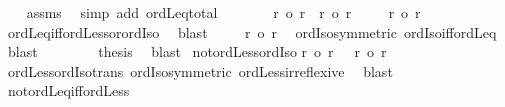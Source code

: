 \begin{isabellebody}
\ \ \isamarkupfalse%
\ assms\ \isamarkupfalse%
\ {\isacharparenleft}{\kern0pt}simp\ add{\isacharcolon}{\kern0pt}\ ordLeq{\isacharunderscore}{\kern0pt}total{\isacharparenright}{\kern0pt}\isanewline
\ \ \isamarkupfalse%
\isanewline
\ \ \isacommand{{\isacharbraceleft}{\kern0pt}}\isamarkupfalse%
\isamarkupfalse%
\ {\isachardoublequoteopen}{\isasymnot}\ r\ {\isacharless}{\kern0pt}o\ r{\isacharprime}{\kern0pt}\ {\isasymand}\ r\ {\isasymle}o\ r{\isacharprime}{\kern0pt}{\isachardoublequoteclose}\isanewline
\ \ \ \isamarkupfalse%
\ {\isachardoublequoteopen}r\ {\isacharequal}{\kern0pt}o\ r{\isacharprime}{\kern0pt}{\isachardoublequoteclose}\ \isamarkupfalse%
\ ordLeq{\isacharunderscore}{\kern0pt}iff{\isacharunderscore}{\kern0pt}ordLess{\isacharunderscore}{\kern0pt}or{\isacharunderscore}{\kern0pt}ordIso\ \isamarkupfalse%
\ blast\isanewline
\ \ \ \isamarkupfalse%
\ {\isachardoublequoteopen}r{\isacharprime}{\kern0pt}\ {\isasymle}o\ r{\isachardoublequoteclose}\ \isamarkupfalse%
\ ordIso{\isacharunderscore}{\kern0pt}symmetric\ ordIso{\isacharunderscore}{\kern0pt}iff{\isacharunderscore}{\kern0pt}ordLeq\ \isamarkupfalse%
\ blast\isanewline
\ \ \isacommand{{\isacharbraceright}{\kern0pt}}\isamarkupfalse%
\isanewline
\ \ \isamarkupfalse%
\ \isamarkupfalse%
\ {\isacharquery}{\kern0pt}thesis\ \isamarkupfalse%
\ blast\isanewline
{}\isamarkupfalse%
%
\endisatagproof
{\isafoldproof}%
%
\isadelimproof
\isanewline
%
\endisadelimproof
\isanewline
{}\isamarkupfalse%
\ not{\isacharunderscore}{\kern0pt}ordLess{\isacharunderscore}{\kern0pt}ordIso{\isacharcolon}{\kern0pt}\isanewline
{\isachardoublequoteopen}r\ {\isacharless}{\kern0pt}o\ r{\isacharprime}{\kern0pt}\ {\isasymLongrightarrow}\ {\isasymnot}\ r\ {\isacharequal}{\kern0pt}o\ r{\isacharprime}{\kern0pt}{\isachardoublequoteclose}\isanewline
%
\isadelimproof
%
\endisadelimproof
%
\isatagproof
{}\isamarkupfalse%
\ ordLess{\isacharunderscore}{\kern0pt}ordIso{\isacharunderscore}{\kern0pt}trans\ ordIso{\isacharunderscore}{\kern0pt}symmetric\ ordLess{\isacharunderscore}{\kern0pt}irreflexive\ \isamarkupfalse%
\ blast%
\endisatagproof
{\isafoldproof}%
%
\isadelimproof
\isanewline
%
\endisadelimproof
\isanewline
{}\isamarkupfalse%
\ not{\isacharunderscore}{\kern0pt}ordLeq{\isacharunderscore}{\kern0pt}iff{\isacharunderscore}{\kern0pt}ordLess{\isacharcolon}{\kern0pt}\isanewline

\end{isabellebody}

